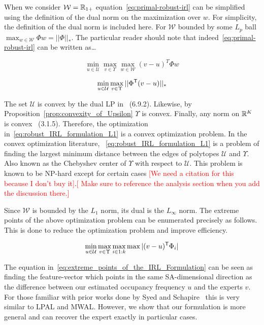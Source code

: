 \documentclass[11pt]{article}
\newcommand{\gersi}[1]{\textcolor{red}{[#1]}}
\begin{document}
When we consider $\mathcal{W} = \mathbb{R}_{1+}$ equation~\eqref{eq:primal-robust-irl} can be simplified using the definition of the dual norm on the maximization
over $w$. For simplicity, the definition of the dual norm is included here. For $\mathcal{W}$ bounded by some $L_p$ ball $\max_{w \in \mathcal{W}} \Phi w = ||\Phi||_*$.
The particular reader should note that indeed~\eqref{eq:primal-robust-irl} can be written as\dots

\begin{equation}
	\min_{u \in \mathcal{U}} \max_{v \in \Upsilon} \max_{w \in \mathcal{W}} {(v - u)}^T \Phi w
\end{equation}

\begin{equation}
	\label{eq:robust_IRL_formulation_L1}
	\min_{u \in \mathcal{U}} \max_{v \in \Upsilon} ||\Phi^{\mathsf{T}} (v - u)||_*
\end{equation}

The set $\mathcal{U}$ is convex by the dual LP in~\cite{Puterman1994} (6.9.2).
Likewise, by Proposition~\ref{prop:convexity_of_Upsilon} $\Upsilon$ is convex.
Finally, any norm on $\mathbb{R}^K$ is convex~\cite{boyd_convex_optimization} (3.1.5).
Therefore, the optimization in~\eqref{eq:robust_IRL_formulation_L1} is a convex
optimization problem. In the convex optimization literature,
~\eqref{eq:robust_IRL_formulation_L1} is a problem of finding the largest minimum
distance between the edges of polytopes $\mathcal{U}$ and $\Upsilon$. Also known as the Chebyshev center of $\Upsilon$ with respect to $\mathcal{U}$.
This problem is known to be NP-hard except for certain cases \gersi{We need a
	citation for this because I don't buy it}.\gersi{ Make sure to reference the analysis section when you add the discussion there.}

Since $\mathcal{W}$ is bounded by the $L_1$ norm, its dual is the $L_\infty$ norm. The extreme points of the above
optimization problem can be enumerated precisely as follows.
This is done to reduce the optimization problem and improve efficiency.

\begin{equation}
	\label{eq:extreme_points_of_the_IRL_Formulation}
	\min_{u \in \mathcal{U}} \max_{v \in \Upsilon} \max_{i \in 1:k} \max|(v - u)^{\mathsf{T}} \Phi_i|
\end{equation}

The equation in~\eqref{eq:extreme_points_of_the_IRL_Formulation} can be seen as
finding the feature-vector which points in the same SA-dimensional direction as
the difference between our estimated occupancy frequency $u$ and the experts
$v$. For those familiar with prior works done by Syed and Schapire~\cite{Syed2008} this is very similar to LPAL and MWAL.
However, we show that our formulation is more general and can recover the expert exactly in particular cases.
\end{document}
